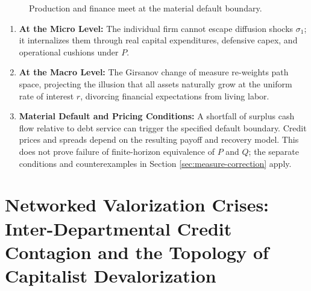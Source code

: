 \documentclass[11pt,letterpaper]{report}
\begin{document}
\begin{figure}[H]\centering
{}
\caption{Production and finance meet at the material default boundary.}
\end{figure}
\begin{enumerate}
\item \textbf{At the Micro Level:} The individual firm cannot escape diffusion shocks ${\sigma }_{1}$; it internalizes them through real capital expenditures, defensive capex, and operational cushions under $P$.
\item \textbf{At the Macro Level:} The Girsanov change of measure re-weights path space, projecting the illusion that all assets naturally grow at the uniform rate of interest $r$, divorcing financial expectations from living labor.
\item \textbf{Material Default and Pricing Conditions:} A shortfall of surplus cash flow relative to debt service can trigger the specified default boundary. Credit prices and spreads depend on the resulting payoff and recovery model. This does not prove failure of finite-horizon equivalence of $P$ and $Q$; the separate conditions and counterexamples in Section \ref{sec:measure-correction} apply.
\end{enumerate}
\chapter{Networked Valorization Crises: Inter-Departmental Credit Contagion and the Topology of Capitalist Devalorization}
\end{document}
